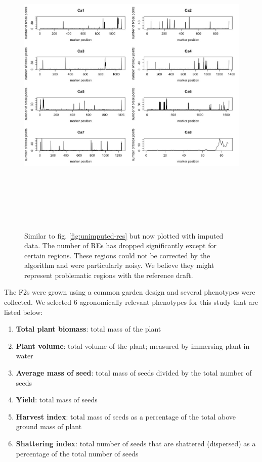 \begin{figure}
    \centering
    \includegraphics[height = 15cm, width = 15cm]{tex/chickpea/imputed-res.jpeg}
    \caption{Similar to fig. \ref{fig:unimputed-res} but now plotted with imputed data. The number of REs has dropped significantly except for certain regions. These regions could not be corrected by the algorithm and were particularly noisy. We believe they might represent problematic regions with the reference draft.}
    \label{fig:imputed-res}
\end{figure}

The F2s were grown using a common garden design and several phenotypes were collected. We selected 6 agronomically relevant phenotypes for this study that are listed below:

\begin{enumerate}
    \item \textbf{Total plant biomass}: total mass of the plant
    \item \textbf{Plant volume}: total volume of the plant; measured by immersing plant in water
    \item \textbf{Average mass of seed}: total mass of seeds divided by the total number of seeds
    \item \textbf{Yield}: total mass of seeds
    \item \textbf{Harvest index}: total mass of seeds as a percentage of the total above ground mass of plant
    \item \textbf{Shattering index}: total number of seeds that are shattered (dispersed) as a percentage of the total number of seeds
\end{enumerate}

